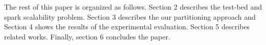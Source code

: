 \else

\fi


The rest of this paper is organized as follows.
Section 2 describes the test-bed and spark scalability problem.
Section 3 describes the our partitioning approach and 
Section 4 shows the results of the experimental evaluation. 
Section 5 describes related works. 
Finally, section 6 concludes the paper.

